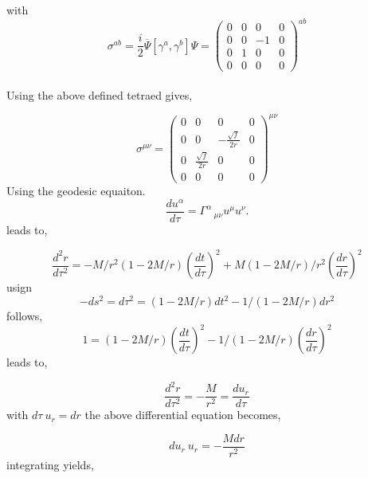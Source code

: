 \documentclass[12pt,a4paper]{article}
\begin{document}
	
	with 
		$$
	\sigma^{a b} = \frac{i}{2} \overbar{\Psi}[\gamma^a,\gamma^b]\Psi = \left(\begin{matrix}0 & 0 & 0 & 0\\0 & 0 & - 1 & 0\\0 & 1 & 0 & 0\\0 & 0 & 0 & 0\end{matrix}\right)^{ab}
	$$\\
	
	Using the above defined tetraed gives,
	
	$$
	\sigma^{\mu \nu} = \left(\begin{matrix}0 & 0 & 0 & 0\\0 & 0 & - \frac{\sqrt{f}}{2 r} & 0\\0 & \frac{\sqrt{f}}{2 r} & 0 & 0\\0 & 0 & 0 & 0\end{matrix}\right)^{\mu \nu}
	$$
	Using the geodesic equaiton.
	$$
	\frac{du^\alpha}{d \tau} = \Gamma^{\alpha}\,_{\mu \nu}u^\mu u^\nu.
	$$
	leads to,
	
	$$
	\frac{d^2 r}{d \tau^2} = -M /r^2 (1-2M/r) \left(\frac{dt}{d\tau}\right)^2 + M (1-2M/r)/r^2 \left(\frac{dr}{d \tau}\right)^2
	$$
	usign $$-ds^2 = d\tau^2 = \left(1- 2M/r\right)dt^2 - 1/(1-2M/r)dr^2$$
	follows,
	$$
	1 = (1-2M/r)\left(\frac{dt}{d\tau}\right)^2 - 1/(1-2M/r)\left(\frac{dr}{d\tau}\right)^2
	$$
	leads to,
	
	$$
	\frac{d^2r}{d\tau^2} = - \frac{M}{r^2} = \frac{d u_r}{d\tau}
	$$
	with $d\tau \  u_r = d r$ the above differential equation becomes,
	
	$$
	du_r \ u_r = -\frac{M dr}{r^2}
	$$
	integrating yields,
	
\end{document}
